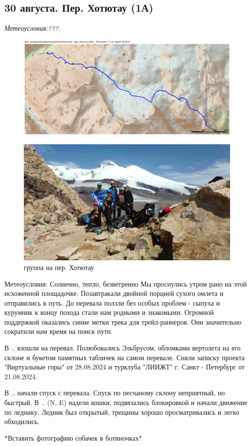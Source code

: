 \subsection{30 августа. Пер. Хотютау (1А)}
\textit{Метеоусловия:???.}

\begin{figure}[h!]
	\centering
	\includegraphics[angle=0, width=0.3\linewidth]{../pics/mini_maps/30}
	\label{fig:mini_30}
\end{figure}




\begin{figure}[h!]
	\centering
	\includegraphics[width=0.7\linewidth]{../pics/DJI_0899}
	\caption{группа на пер. Хотютау}
	\label{fig:hotyutau_1}
\end{figure}
Метеоусловия: Солнечно, тепло, безветренно
Мы проснулись утром рано на этой исхоженной площадочке. Позавтракали двойной порцией сухого омлета и отправились в путь.
До перевала ползли без особых проблем - сыпуха и курумник к концу похода стали нам родными и знакомыми. Огромной поддержкой оказались синие метки трека для трейл-раннеров. Они значительно сократили нам время на поиск пути.

В .. взошли на перевал. Полюбовались Эльбрусом, обломками вертолета на его склоне и букетом памятных табличек на самом перевале. Сняли записку проекта "Виртуальные горы" от 28.08.2024 и турклуба "ЛИИЖТ" г. Санкт - Петербург от 21.08.2024.

В .. начали спуск с перевала. Спуск по песчаному склону неприятный, но быстрый. В .. (N, E) надели кошки, подвязались блокировкой и начали движение по леднику. Ледник был открытый, трещины хорошо просматривались и легко обходились.

*Вставить фотографию собачек в ботиночках*

